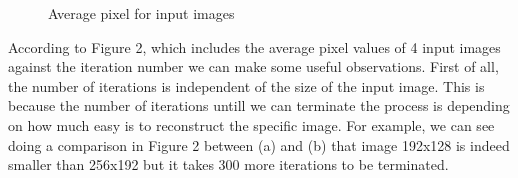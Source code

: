 \documentclass[12pt,a4paper]{article}
\begin{document}
        	\begin{figure}[ht]
			    \centering
			    \qquad		    
			    \qquad
			    \qquad
			    \caption{Average pixel for input images}
			    \label{average_pixel}
			\end{figure}

            According to Figure 2, which includes the average pixel values of 4 input images against the iteration number we can make some useful observations. First of all, the number of iterations is independent of the size of the input image. This is because the number of iterations untill we can terminate the process is depending on how much easy is to reconstruct the specific image. For example, we can see doing a comparison in Figure 2 between  (a) and (b) that image 192x128 is indeed smaller than 256x192 but it takes 300 more iterations to be terminated.
\end{document}
